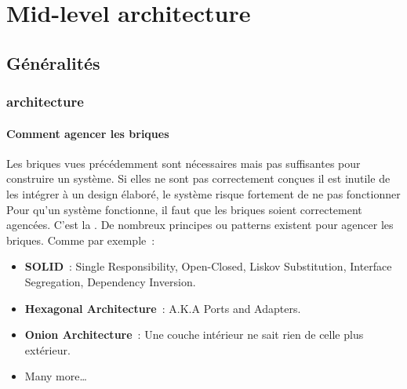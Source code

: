 \documentclass{beamer}
\begin{document}
    \section{Mid-level architecture}\label{sec:mid-level-architecture}

    \subsection{Généralités}\label{subsec:mid-level-generalites}

    \begin{frame}
        \transdissolve
        \frametitle{ architecture}
        \framesubtitle{Comment agencer les briques}
        Les briques vues précédemment sont nécessaires mais pas suffisantes pour construire un système.
        Si elles ne sont pas correctement conçues il est inutile de les intégrer à un design élaboré, le système risque fortement de ne pas fonctionner
        \bigbreak
        Pour qu'un système fonctionne, il faut que les briques soient correctement agencées.
        C'est la .
        \bigbreak
        De nombreux principes ou patterns existent pour agencer les briques.
        Comme par exemple~:
        \begin{itemize}
            \item \textbf{SOLID}~: Single Responsibility, Open-Closed, Liskov Substitution, Interface Segregation, Dependency Inversion.
            \item \textbf{Hexagonal Architecture}~: A.K.A Ports and Adapters.
            \item \textbf{Onion Architecture}~: Une couche intérieur ne sait rien de celle plus extérieur.
            \item Many more\ldots
        \end{itemize}
    \end{frame}
\end{document}
